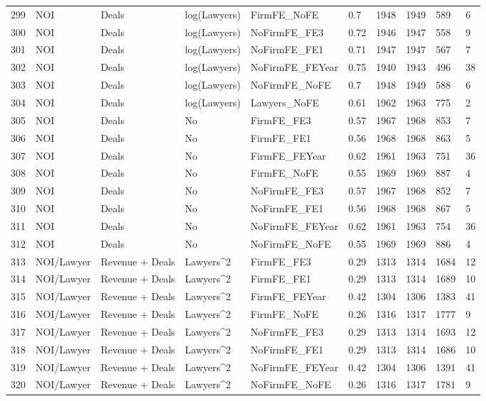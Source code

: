 \documentclass{article}
\begin{document}
\begin{table}[H]
\begin{tabular}{rlllllllll}
  299 & NOI & Deals & log(Lawyers) & FirmFE\_NoFE & 0.7 & 1948 & 1949 & 589 & 6 \\ 
  300 & NOI & Deals & log(Lawyers) & NoFirmFE\_FE3 & 0.72 & 1946 & 1947 & 558 & 9 \\ 
  301 & NOI & Deals & log(Lawyers) & NoFirmFE\_FE1 & 0.71 & 1947 & 1947 & 567 & 7 \\ 
  302 & NOI & Deals & log(Lawyers) & NoFirmFE\_FEYear & 0.75 & 1940 & 1943 & 496 & 38 \\ 
  303 & NOI & Deals & log(Lawyers) & NoFirmFE\_NoFE & 0.7 & 1948 & 1949 & 588 & 6 \\ 
  304 & NOI & Deals & log(Lawyers) & Lawyers\_NoFE & 0.61 & 1962 & 1963 & 775 & 2 \\ 
  305 & NOI & Deals & No & FirmFE\_FE3 & 0.57 & 1967 & 1968 & 853 & 7 \\ 
  306 & NOI & Deals & No & FirmFE\_FE1 & 0.56 & 1968 & 1968 & 863 & 5 \\ 
  307 & NOI & Deals & No & FirmFE\_FEYear & 0.62 & 1961 & 1963 & 751 & 36 \\ 
  308 & NOI & Deals & No & FirmFE\_NoFE & 0.55 & 1969 & 1969 & 887 & 4 \\ 
  309 & NOI & Deals & No & NoFirmFE\_FE3 & 0.57 & 1967 & 1968 & 852 & 7 \\ 
  310 & NOI & Deals & No & NoFirmFE\_FE1 & 0.56 & 1968 & 1968 & 867 & 5 \\ 
  311 & NOI & Deals & No & NoFirmFE\_FEYear & 0.62 & 1961 & 1963 & 754 & 36 \\ 
  312 & NOI & Deals & No & NoFirmFE\_NoFE & 0.55 & 1969 & 1969 & 886 & 4 \\ 
  313 & NOI/Lawyer & Revenue + Deals & Lawyers^2 & FirmFE\_FE3 & 0.29 & 1313 & 1314 & 1684 & 12 \\ 
  314 & NOI/Lawyer & Revenue + Deals & Lawyers^2 & FirmFE\_FE1 & 0.29 & 1313 & 1314 & 1689 & 10 \\ 
  315 & NOI/Lawyer & Revenue + Deals & Lawyers^2 & FirmFE\_FEYear & 0.42 & 1304 & 1306 & 1383 & 41 \\ 
  316 & NOI/Lawyer & Revenue + Deals & Lawyers^2 & FirmFE\_NoFE & 0.26 & 1316 & 1317 & 1777 & 9 \\ 
  317 & NOI/Lawyer & Revenue + Deals & Lawyers^2 & NoFirmFE\_FE3 & 0.29 & 1313 & 1314 & 1693 & 12 \\ 
  318 & NOI/Lawyer & Revenue + Deals & Lawyers^2 & NoFirmFE\_FE1 & 0.29 & 1313 & 1314 & 1686 & 10 \\ 
  319 & NOI/Lawyer & Revenue + Deals & Lawyers^2 & NoFirmFE\_FEYear & 0.42 & 1304 & 1306 & 1391 & 41 \\ 
  320 & NOI/Lawyer & Revenue + Deals & Lawyers^2 & NoFirmFE\_NoFE & 0.26 & 1316 & 1317 & 1781 & 9 \\ 
   \hline
\end{tabular}
\end{table}
\end{document}
